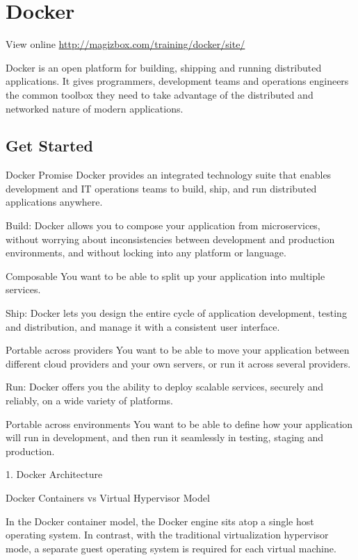\chapter{Docker}

View online \href{http://magizbox.com/training/docker/site/}{http://magizbox.com/training/docker/site/}

Docker is an open platform for building, shipping and running distributed applications. It gives programmers, development teams and operations engineers the common toolbox they need to take advantage of the distributed and networked nature of modern applications.

\section{Get Started}

Docker Promise
Docker provides an integrated technology suite that enables development and IT operations teams to build, ship, and run distributed applications anywhere.



Build: Docker allows you to compose your application from microservices, without worrying about inconsistencies between development and production environments, and without locking into any platform or language.

Composable You want to be able to split up your application into multiple services.

Ship: Docker lets you design the entire cycle of application development, testing and distribution, and manage it with a consistent user interface.

Portable across providers You want to be able to move your application between different cloud providers and your own servers, or run it across several providers.

Run: Docker offers you the ability to deploy scalable services, securely and reliably, on a wide variety of platforms.

Portable across environments You want to be able to define how your application will run in development, and then run it seamlessly in testing, staging and production.

1. Docker Architecture


Docker Containers vs Virtual Hypervisor Model



In the Docker container model, the Docker engine sits atop a single host operating system. In contrast, with the traditional virtualization hypervisor mode, a separate guest operating system is required for each virtual machine.

